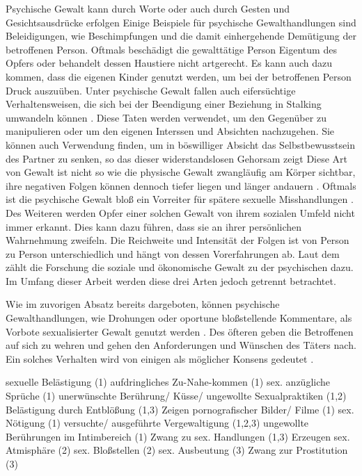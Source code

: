 Psychische Gewalt kann durch Worte oder auch durch Gesten und Gesichtsausdrücke erfolgen \parencite{Def_haus_Gewalt_2}
Einige Beispiele für psychische Gewalthandlungen sind Beleidigungen, wie Beschimpfungen und die damit 
einhergehende Demütigung der betroffenen Person. Oftmals beschädigt die gewalttätige Person Eigentum
des Opfers oder behandelt dessen Haustiere nicht artgerecht. Es kann auch dazu kommen, dass die 
eigenen Kinder genutzt werden, um bei der betroffenen Person Druck auszuüben. Unter psychische Gewalt
fallen auch  eifersüchtige Verhaltensweisen, die sich bei der Beendigung einer Beziehung in Stalking
umwandeln können \parencite{Def_Form_Folge_Gewalt, Gewaltart, Def_haus_Gewalt_2}.
Diese Taten werden verwendet, um den Gegenüber zu manipulieren oder um den eigenen Interssen und 
Absichten nachzugehen. Sie können auch Verwendung finden, um in böswilliger Absicht das 
Selbstbewusstsein des Partner zu senken, so das dieser widerstandslosen Gehorsam zeigt \parencite{Def_haus_Gewalt_2}
Diese Art von Gewalt ist nicht so wie die physische Gewalt zwangläufig am Körper sichtbar, ihre 
negativen Folgen können dennoch tiefer liegen und länger andauern \parencite{psych_Gewalt}.
Oftmals ist die psychische Gewalt bloß ein Vorreiter für spätere sexuelle Misshandlungen \parencite{psych_Gewalt_2}.
Des Weiteren werden Opfer einer solchen Gewalt von ihrem sozialen Umfeld nicht immer erkannt. Dies 
kann dazu führen, dass sie an ihrer persönlichen Wahrnehmung zweifeln. Die Reichweite und Intensität
der Folgen ist von Person zu Person unterschiedlich und hängt von dessen Vorerfahrungen ab.
Laut dem \textcite{Def_Form_Folge_Gewalt}
zählt die Forschung die soziale und ökonomische Gewalt zu der psychischen dazu. Im Umfang dieser 
Arbeit werden diese drei Arten jedoch getrennt betrachtet. 

Wie im zuvorigen Absatz bereits dargeboten, können psychische Gewalthandlungen, wie Drohungen oder 
oportune bloßstellende Kommentare, als Vorbote sexualisierter Gewalt genutzt werden \parencite{Übergang_psy_zu_sex_Gewalt}.
Des öfteren geben die Betroffenen auf sich zu wehren und gehen den Anforderungen und Wünschen des
Täters nach. Ein solches Verhalten wird von einigen als möglicher Konsens gedeutet \parencite{Def_haus_Gewalt_2}.


sexuelle Belästigung (1)
    aufdringliches Zu-Nahe-kommen (1)
    sex. anzügliche Sprüche (1)
    unerwünschte Berührung/ Küsse/ ungewollte Sexualpraktiken (1,2)
    Belästigung durch Entblößung (1,3)
    Zeigen pornografischer Bilder/ Filme (1)
sex. Nötigung (1)
versuchte/ ausgeführte Vergewaltigung (1,2,3)
ungewollte Berührungen im Intimbereich (1)
Zwang zu sex. Handlungen (1,3) 
Erzeugen sex. Atmisphäre (2)
sex. Bloßstellen (2)
sex. Ausbeutung (3)
Zwang zur Prostitution (3)

